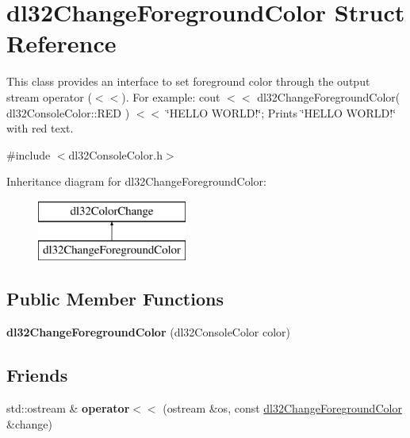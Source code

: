 \hypertarget{structdl32_change_foreground_color}{\section{dl32\-Change\-Foreground\-Color Struct Reference}
\label{structdl32_change_foreground_color}
}


This class provides an interface to set foreground color through the output stream operator ($<$$<$). For example\-: cout $<$$<$ dl32\-Change\-Foreground\-Color( dl32\-Console\-Color\-::\-R\-E\-D ) $<$$<$ \char`\"{}\-H\-E\-L\-L\-O W\-O\-R\-L\-D!\char`\"{}; Prints \char`\"{}\-H\-E\-L\-L\-O W\-O\-R\-L\-D!\char`\"{} with red text.  




{\ttfamily \#include $<$dl32\-Console\-Color.\-h$>$}

Inheritance diagram for dl32\-Change\-Foreground\-Color\-:\begin{figure}[H]
\begin{center}
\leavevmode
\includegraphics[height=2.000000cm]{structdl32_change_foreground_color}
\end{center}
\end{figure}
\subsection*{Public Member Functions}
\begin{DoxyCompactItemize}
\item 
\hypertarget{structdl32_change_foreground_color_ad3f01cacba16d3859ff2e03680da4d71}{{\bfseries dl32\-Change\-Foreground\-Color} (dl32\-Console\-Color color)}\label{structdl32_change_foreground_color_ad3f01cacba16d3859ff2e03680da4d71}

\end{DoxyCompactItemize}
\subsection*{Friends}
\begin{DoxyCompactItemize}
\item 
\hypertarget{structdl32_change_foreground_color_a64ec08fd2ca269ba5138457c8c0f35f3}{std\-::ostream \& {\bfseries operator$<$$<$} (ostream \&os, const \hyperlink{structdl32_change_foreground_color}{dl32\-Change\-Foreground\-Color} \&change)}\label{structdl32_change_foreground_color_a64ec08fd2ca269ba5138457c8c0f35f3}

\end{DoxyCompactItemize}
